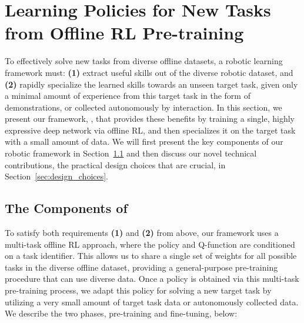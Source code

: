\vspace{0.1cm}
\section{Learning Policies for New Tasks from Offline RL Pre-training}
\label{sec:method}
\vspace{0.1cm}

To effectively solve new tasks from diverse offline datasets, a robotic learning framework must: \textbf{(1)} extract useful skills out of the diverse robotic dataset, and \textbf{(2)} rapidly specialize the learned skills towards an unseen target task, given only a minimal amount of experience from this target task in the form of demonstrations, or collected autonomously by interaction. In this section, we present our framework, \ptrmethodname, that provides these benefits by training a single, highly expressive deep network via offline RL, and then specializes it on the target task with a small amount of data. We will first present the key components of our robotic framework in Section~\ref{sec:algorithm} and then discuss our novel technical contributions, the practical design choices that are crucial, in Section~\ref{sec:design_choices}.    

\vspace{0.05cm}
\subsection{The Components of \ptrmethodname}
\label{sec:algorithm}
\vspace{0.1cm}

To satisfy both requirements \textbf{(1)} and \textbf{(2)} from above, our framework uses a multi-task offline RL approach, where the policy and Q-function are conditioned on a task identifier. This allows us to share a single set of weights for all possible tasks in the diverse offline dataset, providing a general-purpose pre-training procedure that can use diverse data. 
Once a policy is obtained via this multi-task pre-training process, we adapt this policy for solving a new target task by utilizing a very small amount of target task data or autonomously collected data. We describe the two phases, pre-training and fine-tuning, below:

